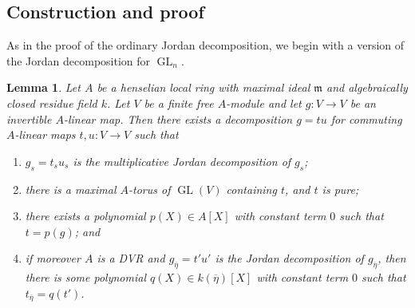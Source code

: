 \documentclass[11pt,reqno]{amsart}
\newtheorem{lemma}[theorem]{Lemma}
\theoremstyle{definition}
\newcommand{\fm}{\mathfrak{m}}
\DeclareMathOperator{\GL}{GL}
\begin{document}
\subsection{Construction and proof}

As in the proof of the ordinary Jordan decomposition, we begin with a version of the Jordan decomposition for $\GL_n$.

\begin{lemma}\label{lemma:relative-jordan-decomposition-for-matrices}
Let $A$ be a henselian local ring with maximal ideal $\fm$ and algebraically closed residue field $k$. Let $V$ be a finite free $A$-module and let $g: V \to V$ be an invertible $A$-linear map. Then there exists a decomposition $g = t u$ for commuting $A$-linear maps $t, u: V \to V$ such that
\begin{enumerate}
    \item\label{item:gln-jordan-special-fiber} $g_s = t_s u_s$ is the multiplicative Jordan decomposition of $g_s$;
    \item\label{item:gln-jordan-torus-character-vanishing} there is a maximal $A$-torus of $\GL(V)$ containing $t$, and $t$ is pure;
    \item\label{item:gln-jordan-polynomial} there exists a polynomial $p(X) \in A[X]$ with constant term $0$ such that $t = p(g)$; and
    \item\label{item:gln-jordan-generic-fiber} if moreover $A$ is a DVR and $g_{\overline{\eta}} = t' u'$ is the Jordan decomposition of $g_{\overline{\eta}}$, then there is some polynomial $q(X) \in k(\overline{\eta})[X]$ with constant term $0$ such that $t_{\overline{\eta}} = q(t')$.
\end{enumerate}
\end{lemma}
\end{document}
